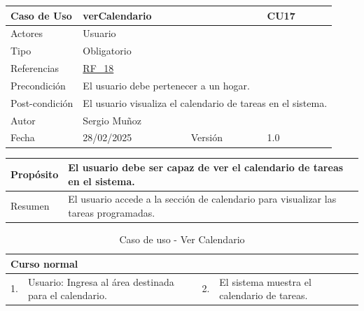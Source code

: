 \newpage

\begin{table}[H]
    \centering
    \begin{tabular}{| m{} | m{} | m{} | m{} |}
        \hline
        \rowcolor[HTML]{C0C0C0} Caso de Uso & \multicolumn{2}{|m{0.43\textwidth}|}{verCalendario} &  CU17\\ 
        \hline
        Actores & \multicolumn{3}{l|}{Usuario} \\ 
        \hline
        Tipo & \multicolumn{3}{l|}{Obligatorio} \\ 
        \hline
        Referencias & \multicolumn{3}{l|}{\hyperref[req:RF18]{RF\_18}} \\ 
        \hline
        Precondición & \multicolumn{3}{m{0.67\textwidth}|}{El usuario debe pertenecer a un hogar.} \\ 
        \hline
        Post-condición & \multicolumn{3}{m{0.67\textwidth}|}{El usuario visualiza el calendario de tareas en el sistema.} \\ 
        \hline
        Autor & \multicolumn{3}{l|}{Sergio Muñoz} \\ 
        \hline
        Fecha & 28/02/2025 & Versión & 1.0 \\ 
        \hline
    \end{tabular}
\end{table}

\begin{table}[H]
    \centering
    \begin{tabular}{| m{} | m{} | m{} | m{} |}
        \hline
        Propósito & \multicolumn{3}{m{0.67\textwidth}|}{El usuario debe ser capaz de ver el calendario de tareas en el sistema.} \\ 
        \hline
        Resumen & \multicolumn{3}{m{0.67\textwidth}|}{El usuario accede a la sección de calendario para visualizar las tareas programadas.} \\ 
        \hline
    \end{tabular}
\end{table}

\begin{table}[H]
    \centering
    \begin{tabular}{| m{} | m{} | m{} | m{} |}
        \hline
        \multicolumn{4}{|m{0.9\textwidth}|}{Curso normal} \\ 
        \hline
        1. & Usuario: Ingresa al área destinada para el calendario.
        & 2. & El sistema muestra el calendario de tareas. \\ 
        \hline
    \end{tabular}
    \caption{Caso de uso - Ver Calendario}
\end{table}

